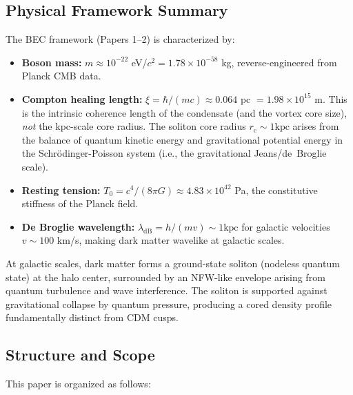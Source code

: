 \documentclass[11pt,a4paper]{article}
\newcommand{\ee}[1]{\times 10^{#1}}
\newcommand{\Tzero}{\ensuremath{T_0}}
\newcommand{\kpc}{\ensuremath{\mathrm{kpc}}}
\newcommand{\rc}{\ensuremath{r_{\mathrm{c}}}}
\newcommand{\lambdadB}{\ensuremath{\lambda_{\mathrm{dB}}}}
\theoremstyle{definition}
\theoremstyle{remark}
\begin{document}
\subsection{Physical Framework Summary}
\label{sec:framework_summary}

The BEC framework (Papers 1--2) is characterized by:

\begin{itemize}[leftmargin=*, itemsep=0.3em]
\item \textbf{Boson mass:} $m \approx 10^{-22}$ eV/$c^2 = 1.78 \ee{-58}$ kg, reverse-engineered from Planck CMB data.
\item \textbf{Compton healing length:} $\xi = \hbar/(mc) \approx 0.064$ pc $= 1.98 \times 10^{15}$ m.  This is the intrinsic coherence length of the condensate (and the vortex core size), \emph{not} the kpc-scale core radius.  The soliton core radius $\rc \sim 1 \kpc$ arises from the balance of quantum kinetic energy and gravitational potential energy in the Schr\"odinger-Poisson system (i.e., the gravitational Jeans/de~Broglie scale).
\item \textbf{Resting tension:} $\Tzero = c^4/(8\pi G) \approx 4.83 \ee{42}$ Pa, the constitutive stiffness of the Planck field.
\item \textbf{De Broglie wavelength:} $\lambdadB = h/(mv) \sim 1 \kpc$ for galactic velocities $v \sim 100$ km/s, making dark matter wavelike at galactic scales.
\end{itemize}

At galactic scales, dark matter forms a ground-state soliton (nodeless quantum state) at the halo center, surrounded by an NFW-like envelope arising from quantum turbulence and wave interference. The soliton is supported against gravitational collapse by quantum pressure, producing a cored density profile fundamentally distinct from CDM cusps.

\subsection{Structure and Scope}
\label{sec:structure}

This paper is organized as follows:
\end{document}
